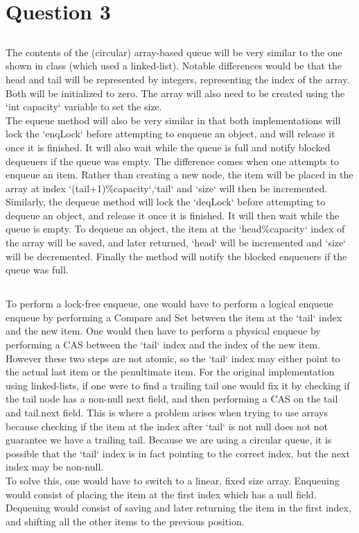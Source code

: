 \documentclass[11pt]{article}
\begin{document}
\section{Question 3}

\subsection{}
The contents of the (circular) array-based queue will be very similar to the one shown in class (which used a linked-list). Notable differences 
would be that the head and tail will be represented by integers, representing the index of the array. Both will be initialized to zero. 
The array will also need to be created using the `int capacity` variable to set the size.\\
The equeue method will also be very similar in that both implementations will lock the `enqLock` before attempting to enqueue an object, 
and will release it once it is finished. It will also wait while the queue is full and notify blocked dequeuers if the queue was empty. 
The difference comes when one attempts to enqueue an item. Rather than creating a new node, the item will be placed in the array at index 
`(tail+1)\%capacity`,`tail` and `size` will then be incremented.\\
Similarly, the dequeue method will lock the `deqLock` before attempting to dequeue an object, and release it once it is finished. It will 
then wait while the queue is empty. To dequeue an object, the item at the `head\%capacity` index of the array will be saved, and later 
returned, `head` will be incremented and `size` will be decremented. Finally the method will notify the blocked enqueuers if the queue 
was full.

\subsection{}
To perform a lock-free enqueue, one would have to perform a logical enqueue enqueue by performing a Compare and Set between the item at 
the `tail` index and the new item. One would then have to perform a physical enqueue by performing a CAS between the `tail` index and the 
index of the new item. However these two steps are not atomic, so the `tail` index may either point to the actual last item or the 
penultimate item. For the original implementation using linked-lists, if one were to find a trailing tail one would fix it by checking if 
the tail node has a non-null next field, and then performing a CAS on the tail and tail.next field. This is where a problem arises when 
trying to use arrays because checking if the item at the index after `tail` is not null does not not guarantee we have a  trailing tail. 
Because we are using a circular queue, it is possible that the `tail` index is in fact pointing to the correct index, but the next index 
may be non-null.\\
To solve this, one would have to switch to a linear, fixed size array. Enqueuing would consist of placing the item at the first index 
which has a null field. Dequeuing would consist of saving and later returning the item in the first index, and shifting all the other 
items to the previous position.
\end{document}
